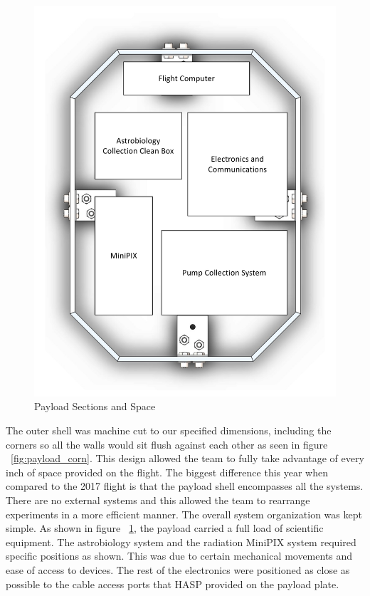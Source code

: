 \begin{figure}[h!]
	\begin{center}
		\includegraphics[width=60 mm, scale=1]{figures/payload_sections.pdf}
		\caption{Payload Sections and Space}
		\label{fig:payload_sec}
	\end{center}
\end{figure}
The outer shell was machine cut to our specified dimensions, including the corners so all the walls would sit flush against each other as seen in figure ~\ref{fig:payload_corn}.  This design allowed the team to fully take advantage of every inch of space provided on the flight.  The biggest difference this year when compared to the 2017 flight is that the payload shell encompasses all the systems.  There are no external systems and this allowed the team to rearrange experiments in a more efficient manner.
The overall system organization was kept simple.  As shown in figure ~\ref{fig:payload_sec}, the payload carried a full load of scientific equipment.  The astrobiology system and the radiation MiniPIX system required specific positions as shown.  This was due to certain mechanical movements and ease of access to devices.  The rest of the electronics were positioned as close as possible to the cable access ports that HASP provided on the payload plate.

